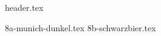 \clearpage
{}
\divisorLine
{header.tex}
\begin{multicols*}{2}
{8a-munich-dunkel.tex}
{8b-schwarzbier.tex}
\end{multicols*}